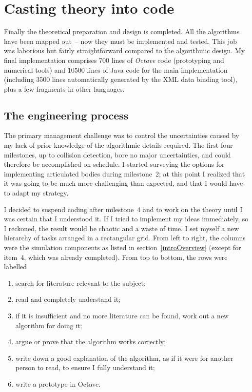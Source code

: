 \section{Casting theory into code\label{implementation}}

Finally the theoretical preparation and design is completed. All the algorithms have been mapped
out~-- now they must be implemented and tested. This job was laborious but fairly straightforward
compared to the algorithmic design. My final implementation comprises 700 lines of \textsl{Octave}
code (prototyping and numerical tools) and 10500 lines of Java code for the main implementation
(including 3500 lines automatically generated by the XML data binding tool), plus a few fragments
in other languages.

\subsection{The engineering process\label{engineering}}

The primary management challenge was to control the uncertainties caused by my lack of prior
knowledge of the algorithmic details required. The first four milestones, up to collision
detection, bore no major uncertainties, and could therefore be accomplished on schedule. I started
surveying the options for implementing articulated bodies during milestone~2; at this point I
realized that it was going to be much more challenging than expected, and that I would have to
adapt my strategy.

I decided to suspend coding after milestone~4 and to work on the theory until I was certain that
I understood it. If I tried to implement my ideas immediately, so I reckoned, the result would be
chaotic and a waste of time. I set myself a new hierarchy of tasks arranged in a rectangular grid.
From left to right, the columns were the simulation components as listed in
section~\ref{introOverview} (except for item~4, which was already completed). From top to bottom,
the rows were labelled
\begin{enumerate}
\item search for literature relevant to the subject;
\item read and completely understand it;
\item if it is insufficient and no more literature can be found, work out a new algorithm for
    doing it;
\item argue or prove that the algorithm works correctly;
\item write down a good explanation of the algorithm, as if it were for another person to read, to
    ensure I fully understand it;
\item write a prototype in Octave.
\end{enumerate}

